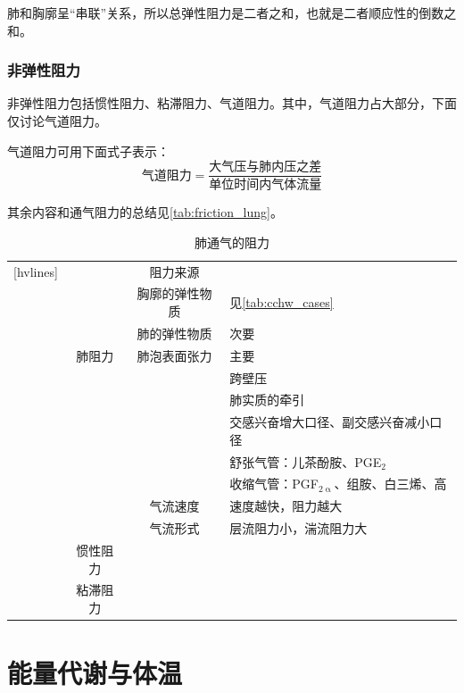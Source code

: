 肺和胸廓呈“串联”关系，所以总弹性阻力是二者之和，也就是二者顺应性的倒数之和。

\subsubsection{非弹性阻力}

非弹性阻力包括惯性阻力、粘滞阻力、气道阻力。其中，气道阻力占大部分，下面仅讨论气道阻力。

气道阻力可用下面式子表示：\[\text{气道阻力}=\frac{\text{大气压与肺内压之差}}{\text{单位时间内气体流量}}\]

其余内容和通气阻力的总结见\autoref{tab:friction_lung}。

\begin{table}[htbp]
	\centering
	\begin{NiceTabularX}{\textwidth}{cccX}[hvlines]
		 &  & 阻力来源 & \\
		 &  & 胸廓的弹性物质 & 见\autoref{tab:cchw_cases}\\
		&  & 肺的弹性物质 & 次要 \\
		& 肺阻力 & 肺泡表面张力 & 主要 \\
		 &  &  & 跨壁压\\
		&  &  & 肺实质的牵引 \\
		&  &  & 交感兴奋增大口径、副交感兴奋减小口径 \\
		&  &  & 舒张气管：儿茶酚胺、PGE$_2$ \\
		&  &  & 收缩气管：PGF$_{2\upalpha}$、组胺、白三烯、高 \\
		&  & 气流速度 & 速度越快，阻力越大\\
		&  & 气流形式 & 层流阻力小，湍流阻力大\\
		& 惯性阻力 &  & \\
		& 粘滞阻力 &  & 
	\end{NiceTabularX}
	\caption{肺通气的阻力}
	\label{tab:friction_lung}
\end{table}








\section{能量代谢与体温}

